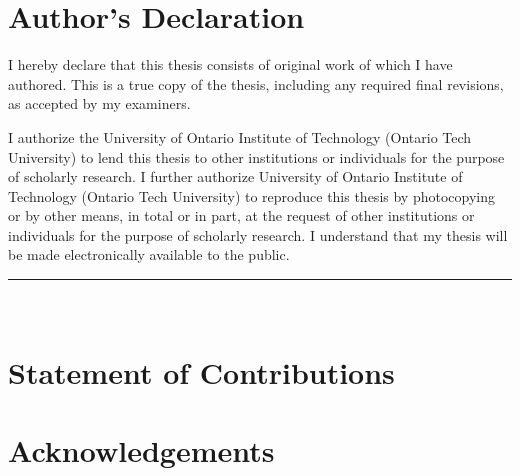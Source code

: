 \clearpage

\chapter*{Author's Declaration}

I hereby declare that this thesis consists of original work of which I have authored. This is a true copy of the thesis, including any required final revisions, as accepted by my examiners.

I authorize the University of Ontario Institute of Technology (Ontario Tech University) to lend this thesis to other institutions or individuals for the purpose of scholarly research. I further authorize University of Ontario Institute of Technology (Ontario Tech University) to reproduce this thesis by photocopying or by other means, in total or in part, at the request of other institutions or individuals for the purpose of scholarly research. I understand that my thesis will be made electronically available to the public.

\vspace{1.5cm}
\noindent\rule{7cm}{0.4pt}\\
\authorname

\clearpage

\chapter*{Statement of Contributions}


\clearpage

\chapter*{Acknowledgements}


\clearpage

